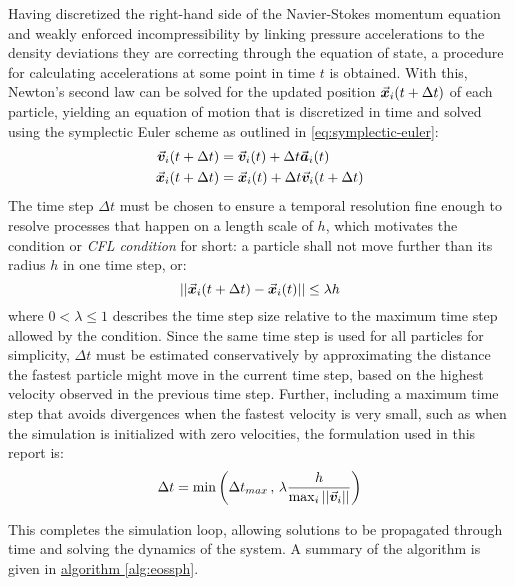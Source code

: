 Having discretized the right-hand side of the Navier-Stokes momentum equation and weakly enforced incompressibility by linking pressure accelerations to the density deviations they are correcting through the equation of state, a procedure for calculating accelerations at some point in time $t$ is obtained. With this, Newton's second law can be solved for the updated position $\vec{\bm{x}}_i(t+\Delta t)$ of each particle, yielding an equation of motion that is discretized in time and solved using the symplectic Euler scheme as outlined in \autoref{eq:symplectic-euler}:
\begin{align}
  \vec{\bm{v}}_i(t+\Delta t) & = \vec{\bm{v}}_i(t) + \Delta t \vec{\bm{a}}_i(t)          \\
  \vec{\bm{x}}_i(t+\Delta t) & = \vec{\bm{x}}_i(t) + \Delta t \vec{\bm{v}}_i(t+\Delta t)
\end{align}
The time step $\Delta t$ must be chosen to ensure a temporal resolution fine enough to resolve processes that happen on a length scale of $h$, which motivates the  condition or \textit{CFL condition} for short: a particle shall not move further than its radius $h$ in one time step, or:
\begin{equation}\label{eq:cfl-condition}
  \left|\left|\vec{\bm{x}}_i(t+\Delta t)-\vec{\bm{x}}_i(t)\right|\right|\leq \lambda h
\end{equation}
where $0<\lambda\leq 1$ describes the time step size relative to the maximum time step allowed by the condition. Since the same time step is used for all particles for simplicity, $\Delta t$ must be estimated conservatively by approximating the distance the fastest particle might move in the current time step, based on the highest velocity observed in the previous time step. Further, including a maximum time step that avoids divergences when the fastest velocity is very small, such as when the simulation is initialized with zero velocities, the formulation used in this report is:
\begin{equation}\label{eq:update-dt}
  \Delta t = \min\left(\Delta t_{max}\,,\,\lambda \frac{h}{\max_i \left|\left|\vec{\bm{v}}_i\right|\right|}\right)
\end{equation}

This completes the simulation loop, allowing solutions to be propagated through time and solving the dynamics of the system. A summary of the algorithm is given in \hyperref[alg:eossph]{algorithm \ref{alg:eossph}}.


